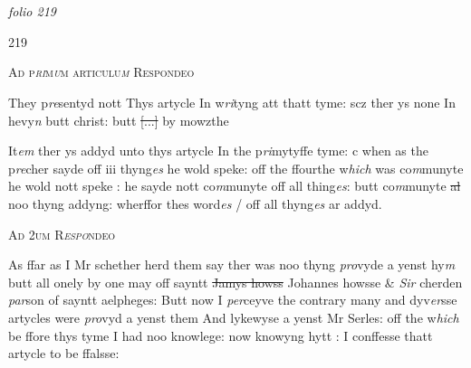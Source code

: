 \documentclass[12pt, a4paper]{book}
\begin{document}
\dotfill
						\newpage {} \section*{}  \subsection*{}

\textit{folio 219}



\begin{flushright}{\color{Mahogany}219}\end{flushright}

				\begin{center} \begin{large} {\scshape Ad p\textit{ri}m\textit{u}m articulu\textit{m} Respondeo} \end{large} \end{center}
			

		\ifthenelse{\isodd{\thepage}}
		{\reversemarginpar}
		{\normalmarginpar}
		They p\textit{re}sentyd nott Thys artycle In w\textit{ri}tyng att thatt tyme: scz ther ys
none In hevy\textit{n }butt christ: butt \sout{
				[...]
			} by mowzthe

		\ifthenelse{\isodd{\thepage}}
		{\reversemarginpar}
		{\normalmarginpar}
		It\textit{em} ther ys addyd unto thys artycle In the p\textit{ri}mytyffe tyme: c when as the p\textit{re}cher
sayde off iii thyng\textit{es} he wold speke: off  the ffourthe w\textit{hich} was co\textit{m}munyte
he wold nott speke : he sayde nott co\textit{m}munyte off all thing\textit{es}: butt
co\textit{m}munyte \sout{al} noo thyng addyng: wherffor thes word\textit{es} / off all thyng\textit{es}
ar addyd.

				\begin{center} \begin{large} {\scshape Ad 2um R\textit{espo}ndeo} \end{large} \end{center}
			

			
            		
		\ifthenelse{\isodd{\thepage}}
		{\reversemarginpar}
		{\normalmarginpar}
		As ffar as I Mr schether
			 herd them say ther was noo thyng \textit{pro}vyde a yenst hy\textit{m}
butt all onely by one may off sayntt
                  \sout{ Jamys howss} Johannes howsse
            			\& \textit{Sir} cherden \textit{par}son of sayntt aelpheges: Butt now I \textit{per}ceyve
the contrary many and dyv\textit{er}sse artycles were\textit{ pro}vyd a yenst them 
And lykewyse a yenst Mr Serles: off the w\textit{hich} be ffore thys tyme I 
had noo knowlege: now knowyng hytt : I conffesse thatt artycle
            			to be 
			ffalsse:
\end{document}
